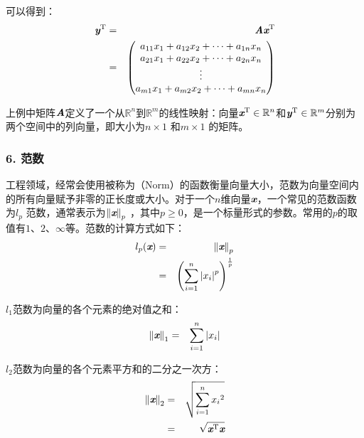 \parinterval 可以得到：
\begin{eqnarray}
{\textbf{\em y}}^{\textrm{T}}& = &{\textbf{\em A}}{\textbf{\em x}}^{\textrm{T}} \nonumber \\
               & = &
\begin{pmatrix}
   a_{11}x_{1}+a_{12}x_{2}+\dots+a_{1n}x_{n}\\
   a_{21}x_{1}+a_{22}x_{2}+\dots+a_{2n}x_{n}\\
   \vdots \\
   a_{m1}x_{1}+a_{m2}x_{2}+\dots+a_{mn}x_{n}
\label{eq:9-13}\end{pmatrix}
\end{eqnarray}

\parinterval 上例中矩阵$ {\textbf{\em A}} $定义了一个从$ {\mathbb R}^n $到$ {\mathbb R}^m $的线性映射：向量$ {\textbf{\em x}}^{\textrm{T}}\in {\mathbb R}^n $和$ {\textbf{\em y}}^{\textrm{T}}\in {\mathbb R}^m $分别为两个空间中的列向量，即大小为$ n\times 1 $ 和$ m\times 1 $ 的矩阵。


\subsubsection{6. 范数}

\parinterval 工程领域，经常会使用被称为{\small{}}（Norm）的函数衡量向量大小，范数为向量空间内的所有向量赋予非零的正长度或大小。对于一个$n$维向量$ {\textbf{\em x}} $，一个常见的范数函数为$ l_p $ 范数，通常表示为$ {\Vert{\textbf{\em x}}\Vert}_p $ ，其中$p\ge 0$，是一个标量形式的参数。常用的$ p $的取值有$ 1 $、$ 2 $、$ \infty $等。范数的计算方式如下：
\begin{eqnarray}
l_p({\textbf{\em x}}) & = & {\Vert{\textbf{\em x}}\Vert}_p \nonumber \\
               & = & {\left (\sum_{i=1}^{n}{{\vert x_{i}\vert}^p}\right )}^{\frac{1}{p}}
\label{eq:9-14}
\end{eqnarray}

\parinterval $ l_1 $范数为向量的各个元素的绝对值之和：
\begin{eqnarray}
{\Vert{\textbf{\em x}}\Vert}_1&=&\sum_{i=1}^{n}{\vert x_{i}\vert}
\label{eq:9-15}
\end{eqnarray}

\parinterval $ l_2 $范数为向量的各个元素平方和的二分之一次方：
\begin{eqnarray}
{\Vert{\textbf{\em x}}\Vert}_2&=&\sqrt{\sum_{i=1}^{n}{{x_{i}}^2}} \nonumber \\
                                      &=&\sqrt{{\textbf{\em x}}^{\textrm T}{\textbf{\em x}}}
\label{eq:9-16}
\end{eqnarray}

